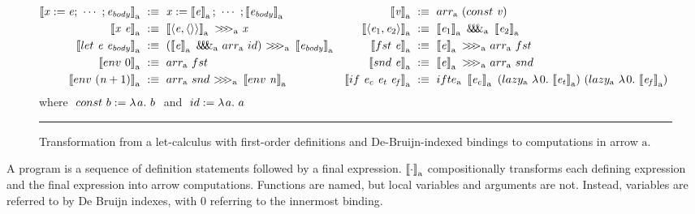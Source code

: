 \documentclass[preprint]{sigplanconf}
\newcommand{\arrow}{\rightsquigarrow}
\newcommand{\arrowarr}{\ensuremath{arr}}
\newcommand{\arrowcomp}{\ensuremath{{>}\mspace{-6mu}{>}\mspace{-6mu}{>}}}
\newcommand{\arrowpair}{\ensuremath{\mathit{\&\mspace{-7.5mu}\&\mspace{-7.5mu}\&}}}
\newcommand{\arrowif}{\ensuremath{ifte}}
\newcommand{\arrowlazy}{\ensuremath{lazy}}
\newcommand{\gen}{_\mathrm{a}}
\begin{document}
\begin{figure*}[t]\centering
\begin{align*}
\begin{aligned}[t]
	\meaningof{\mathit{x} := \mathit{e};\ \cdots\ ; \mathit{e_{body}}}\gen &\ :\equiv\
		\mathit{x} := \meaningof{\mathit{e}}\gen;\ \cdots \ ; \meaningof{\mathit{e_{body}}}\gen \\
	\meaningof{\mathit{x}~\mathit{e}}\gen &\ :\equiv\
		\meaningof{\pair{\mathit{e},\pair{}}}\gen~\arrowcomp\gen~\mathit{x}
\\
	\meaningof{let~\mathit{e}~\mathit{e_{body}}}\gen &\ :\equiv\ 
		(\meaningof{\mathit{e}}\gen~\arrowpair\gen~\arrowarr\gen~id)~
			\arrowcomp\gen~
		\meaningof{\mathit{e_{body}}}\gen
\\
	\meaningof{env~0}\gen &\ :\equiv\ \arrowarr\gen~fst
\\
	\meaningof{env~(\mathit{n}+1)}\gen &\ :\equiv\ \arrowarr\gen~snd~\arrowcomp\gen~\meaningof{env~\mathit{n}}\gen
\end{aligned}
&\tab
\begin{aligned}[t]
	\meaningof{\mathit{v}}\gen &\ :\equiv\ \arrowarr\gen~(const~\mathit{v})
\\
	\meaningof{\pair{\mathit{e}_1,\mathit{e}_2}}\gen &\ :\equiv\
		\meaningof{\mathit{e}_1}\gen~\arrowpair\gen~\meaningof{\mathit{e}_2}\gen
\\
	\meaningof{fst~\mathit{e}}\gen &\ :\equiv\
		\meaningof{\mathit{e}}\gen~\arrowcomp\gen~\arrowarr\gen~fst
\\
	\meaningof{snd~\mathit{e}}\gen &\ :\equiv\
		\meaningof{\mathit{e}}\gen~\arrowcomp\gen~\arrowarr\gen~snd
\\
	\meaningof{if~\mathit{e_c}~\mathit{e_t}~\mathit{e_f}}\gen &\ :\equiv\
		\arrowif\gen~
			\meaningof{\mathit{e_c}}\gen~
			(\arrowlazy\gen~\fun{0}{\meaningof{\mathit{e_t}}\gen})~
			(\arrowlazy\gen~\fun{0}{\meaningof{\mathit{e_f}}\gen})
\end{aligned}
\end{align*}
where $~const~b := \lambda\mspace{2mu}{a}\ldotp\,{b}~$ and $~id := \lambda\mspace{2mu}{a}\ldotp\,{a}~$
\vspace{0.5\baselineskip}
\hrule
\caption{Transformation from a let-calculus with first-order definitions and De-Bruijn-indexed bindings to computations in arrow $\mathrm{a}$.
}
\label{fig:semantic-function}
\end{figure*}

A program is a sequence of definition statements followed by a final expression.
$\meaningof{\cdot}\gen$ compositionally transforms each defining expression and the final expression into arrow computations.
Functions are named, but local variables and arguments are not.
Instead, variables are referred to by De Bruijn indexes, with $0$ referring to the innermost binding.
\end{document}
